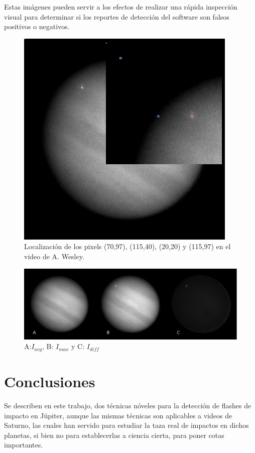\documentclass[a4paper,10pt]{article}
\begin{document}
Estas imágenes pueden servir a los efectos de realizar una rápida inspección visual para 
determinar si los reportes de detección del software son falsos positivos o negativos.

\begin{figure}[H]
\centering
\includegraphics[scale=0.75]{red189.jpg}
\caption{Localización de los pixels (70,97), (115,40), (20,20) y (115,97) en el video de 
A. Wesley.}
\label{pixel-location}
\end{figure}

\begin{figure}[H]
\centering
\includegraphics[scale=0.25]{detect.png}
\caption{A:$I_{avg}$, B: $I_{max}$ y C: $I_{diff}$}
\label{detect}
\end{figure}

\section{Conclusiones}
Se describen en este trabajo, dos técnicas nóveles para la detección de flashes de 
impacto en Júpiter, aunque las mismas técnicas son aplicables a videos de Saturno, las 
cuales han servido para estudiar la taza real de impactos en dichos planetas, si bien no 
para establecerlas a ciencia cierta, para poner cotas importantes\cite{20}.
\end{document}

